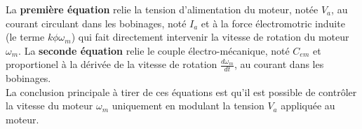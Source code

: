 La \textbf{première équation} relie la tension d'alimentation du moteur, notée $V_a$, au courant circulant dans les bobinages, noté $I_a$ et à la force électromotric induite (le terme $k \phi \omega_m$) qui fait directement intervenir la vitesse de rotation du moteur $\omega_m$. La \textbf{seconde équation} relie le couple électro-mécanique, noté $C_{em}$ et proportionel à la dérivée de la vitesse de rotation $\frac{d\omega_m}{dt}$, au courant dans les bobinages.\\

La conclusion principale à tirer de ces équations est qu'il est possible de contrôler la vitesse du moteur $\omega_m$ uniquement en modulant la tension $V_a$ appliquée au moteur.